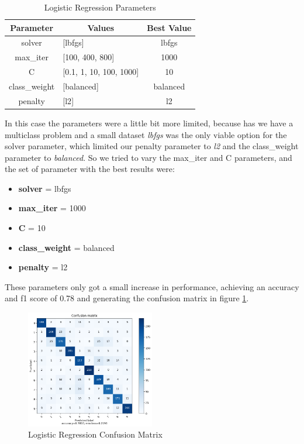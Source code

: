 \documentclass[conference]{IEEEtran}
\begin{document}
\begin{table}[!h]
    \centering
    
    \begin{tabular}{|c|l|c|}
    \hline
    \textbf{Parameter} & \multicolumn{1}{c|}{\textbf{Values}}     & \multicolumn{1}{l|}{\textbf{Best Value}} \\ \hline
    solver       & {[}lbfgs{]}                  & lbfgs                                      \\ \hline
    max\_iter          & {[}100, 400, 800{]}                      & 1000                                  \\ \hline
    C        & {[}0.1, 1, 10, 100, 1000{]}                   & 10                                    \\ \hline
    class\_weight  & {[}balanced{]}                           & balanced                                  \\ \hline
    penalty   & {[}l2{]}                            & l2                               \\ \hline
    \end{tabular}
    \caption{Logistic Regression Parameters \label{tab:lg_parameters}}
\end{table}
In this case the parameters were a little bit more limited, because has we have a multiclass problem and a small dataset 
\textit{lbfgs} was the only viable option for the solver parameter, which limited our penalty parameter to \textit{l2} and the class\_weight parameter to \textit{balanced}.
So we tried to vary the max\_iter and C parameters, and the set of parameter with the best results were:
\begin{itemize}
    \item \textbf{solver} = lbfgs
    \item \textbf{max\_iter} = 1000
    \item \textbf{C} = 10
    \item \textbf{class\_weight} = balanced
    \item \textbf{penalty} = l2
\end{itemize}
These parameters only got a small increase in performance, achieving an accuracy and f1 score of 0.78 and generating the confusion
matrix in figure \ref{fig:lg-confusion-matrix}.

\begin{figure}[!h]
    \centering
    \includegraphics[width=0.5\textwidth]{assets/lg-confusion-matrix.png}
    \caption{Logistic Regression Confusion Matrix}
    \label{fig:lg-confusion-matrix}
\end{figure}
\end{document}
